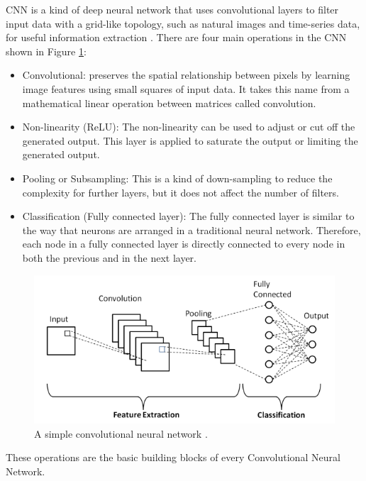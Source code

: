 \documentclass[twoside,letterpaper,twocolumn]{article}
\begin{document}
CNN is a kind of deep neural network that uses convolutional layers to filter input data with a grid-like topology, such as natural images and time-series data, for useful information extraction \citep{Shea(2015)}.
There are four main operations in the CNN shown in Figure \ref{fig:convnet}:
\begin{itemize}
 \item Convolutional: preserves the spatial relationship between pixels by learning image features using small squares of input data. It takes this name from a mathematical linear operation between matrices called convolution.
 
 \item Non-linearity (ReLU): The non-linearity can be used to adjust or cut off the generated output. This layer is applied to saturate the output or limiting the generated output.

 \item Pooling or Subsampling: This is a kind of down-sampling to reduce the complexity for further layers, but it does not affect the number of filters.
 
 \item Classification (Fully connected layer): The fully connected layer is similar to the way that neurons are arranged in a traditional neural network. Therefore, each node in a fully connected layer is directly connected to every node in both the previous and in the next layer.
 
\end{itemize}
\begin{figure}[h!]
	\centering
	\includegraphics[width=\columnwidth]{Figures/convnet.png}
	\caption{A simple convolutional neural network \citep{phung(2019)}.}
	\label{fig:convnet}
\end{figure}

These operations are the basic building blocks of every Convolutional Neural Network.
\end{document}
